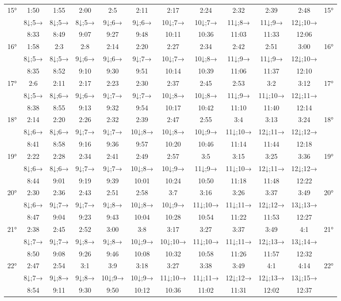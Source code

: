 \begin{scriptsize}
\begin{tabular}{c || c | c | c | c | c | c | c | c | c | c || c}
		\multirow{3}{*}{15°}&1:50&1:55&2:00&2:5&2:11&2:17&2:24&2:32&2:39&2:48&\multirow{3}{*}{15°}\\ \space&8↓;5→&8↓;5→&8↓;5→&9↓;6→&9↓;6→&10↓;7→&10↓;7→&11↓;8→&11↓;9→&12↓;10→&\space\\&8:33&8:49&9:07&9:27&9:48&10:11&10:36&11:03&11:33&12:06&\space\\\hline
		\multirow{3}{*}{16°}&1:58&2:3&2:8&2:14&2:20&2:27&2:34&2:42&2:51&3:00&\multirow{3}{*}{16°}\\ \space&8↓;5→&8↓;5→&9↓;6→&9↓;6→&9↓;7→&10↓;7→&10↓;8→&11↓;9→&11↓;9→&12↓;10→&\space\\&8:35&8:52&9:10&9:30&9:51&10:14&10:39&11:06&11:37&12:10&\space\\\hline
		\multirow{3}{*}{17°}&2:6&2:11&2:17&2:23&2:30&2:37&2:45&2:53&3:2&3:12&\multirow{3}{*}{17°}\\ \space&8↓;5→&8↓;6→&9↓;6→&9↓;7→&9↓;7→&10↓;8→&10↓;8→&11↓;9→&11↓;10→&12↓;11→&\space\\&8:38&8:55&9:13&9:32&9:54&10:17&10:42&11:10&11:40&12:14&\space\\\hline
		\multirow{3}{*}{18°}&2:14&2:20&2:26&2:32&2:39&2:47&2:55&3:4&3:13&3:24&\multirow{3}{*}{18°}\\ \space&8↓;6→&8↓;6→&9↓;7→&9↓;7→&10↓;8→&10↓;8→&10↓;9→&11↓;10→&12↓;11→&12↓;12→&\space\\&8:41&8:58&9:16&9:36&9:57&10:20&10:46&11:14&11:44&12:18&\space\\\hline
		\multirow{3}{*}{19°}&2:22&2:28&2:34&2:41&2:49&2:57&3:5&3:15&3:25&3:36&\multirow{3}{*}{19°}\\ \space&8↓;6→&8↓;6→&9↓;7→&9↓;7→&10↓;8→&10↓;9→&11↓;9→&11↓;10→&12↓;11→&12↓;12→&\space\\&8:44&9:01&9:19&9:39&10:01&10:24&10:50&11:18&11:48&12:22&\space\\\hline
		\multirow{3}{*}{20°}&2:30&2:36&2:43&2:51&2:58&3:7&3:16&3:26&3:37&3:49&\multirow{3}{*}{20°}\\ \space&8↓;6→&9↓;7→&9↓;7→&9↓;8→&10↓;8→&10↓;9→&11↓;10→&11↓;11→&12↓;12→&13↓;13→&\space\\&8:47&9:04&9:23&9:43&10:04&10:28&10:54&11:22&11:53&12:27&\space\\\hline
		\multirow{3}{*}{21°}&2:38&2:45&2:52&3:00&3:8&3:17&3:27&3:37&3:49&4:1&\multirow{3}{*}{21°}\\ \space&8↓;7→&9↓;7→&9↓;8→&9↓;8→&10↓;9→&10↓;10→&11↓;10→&11↓;11→&12↓;13→&13↓;14→&\space\\&8:50&9:08&9:26&9:46&10:08&10:32&10:58&11:26&11:57&12:32&\space\\\hline
		\multirow{3}{*}{22°}&2:47&2:54&3:1&3:9&3:18&3:27&3:38&3:49&4:1&4:14&\multirow{3}{*}{22°}\\ \space&8↓;7→&9↓;8→&9↓;8→&10↓;9→&10↓;9→&11↓;10→&11↓;11→&12↓;12→&12↓;13→&13↓;15→&\space\\&8:54&9:11&9:30&9:50&10:12&10:36&11:02&11:31&12:02&12:37&\space\\\hline

\end{tabular}
\end{scriptsize}
